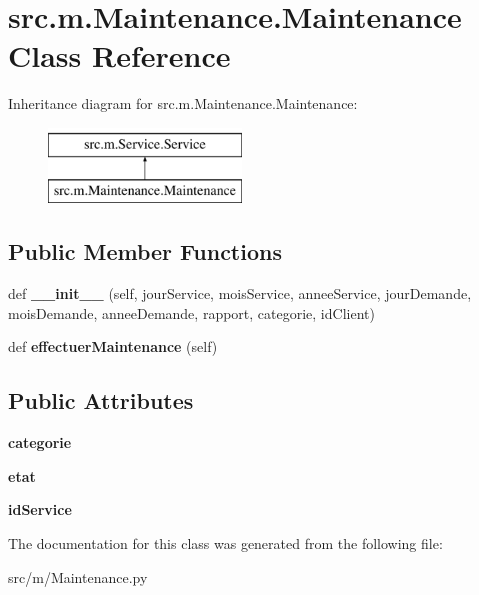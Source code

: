 \hypertarget{classsrc_1_1m_1_1_maintenance_1_1_maintenance}{}\section{src.\+m.\+Maintenance.\+Maintenance Class Reference}
\label{classsrc_1_1m_1_1_maintenance_1_1_maintenance}
Inheritance diagram for src.\+m.\+Maintenance.\+Maintenance\+:\begin{figure}[H]
\begin{center}
\leavevmode
\includegraphics[height=2.000000cm]{classsrc_1_1m_1_1_maintenance_1_1_maintenance}
\end{center}
\end{figure}
\subsection*{Public Member Functions}
\begin{DoxyCompactItemize}
\item 
\hypertarget{classsrc_1_1m_1_1_maintenance_1_1_maintenance_ae333820d63226958dcf59f8dfb9a3ed8}{}def {\bfseries \+\_\+\+\_\+init\+\_\+\+\_\+} (self, jour\+Service, mois\+Service, annee\+Service, jour\+Demande, mois\+Demande, annee\+Demande, rapport, categorie, id\+Client)\label{classsrc_1_1m_1_1_maintenance_1_1_maintenance_ae333820d63226958dcf59f8dfb9a3ed8}

\item 
\hypertarget{classsrc_1_1m_1_1_maintenance_1_1_maintenance_ac5533404812e6bbea164a23925f95475}{}def {\bfseries effectuer\+Maintenance} (self)\label{classsrc_1_1m_1_1_maintenance_1_1_maintenance_ac5533404812e6bbea164a23925f95475}

\end{DoxyCompactItemize}
\subsection*{Public Attributes}
\begin{DoxyCompactItemize}
\item 
\hypertarget{classsrc_1_1m_1_1_maintenance_1_1_maintenance_a24b14972adfbc786dac84171db620648}{}{\bfseries categorie}\label{classsrc_1_1m_1_1_maintenance_1_1_maintenance_a24b14972adfbc786dac84171db620648}

\item 
\hypertarget{classsrc_1_1m_1_1_maintenance_1_1_maintenance_a34885b29bbdbd9847b3e6d56f157318e}{}{\bfseries etat}\label{classsrc_1_1m_1_1_maintenance_1_1_maintenance_a34885b29bbdbd9847b3e6d56f157318e}

\item 
\hypertarget{classsrc_1_1m_1_1_maintenance_1_1_maintenance_a3f6476d3626c84a48ec4523172df38bf}{}{\bfseries id\+Service}\label{classsrc_1_1m_1_1_maintenance_1_1_maintenance_a3f6476d3626c84a48ec4523172df38bf}

\end{DoxyCompactItemize}


The documentation for this class was generated from the following file\+:\begin{DoxyCompactItemize}
\item 
src/m/Maintenance.\+py\end{DoxyCompactItemize}
